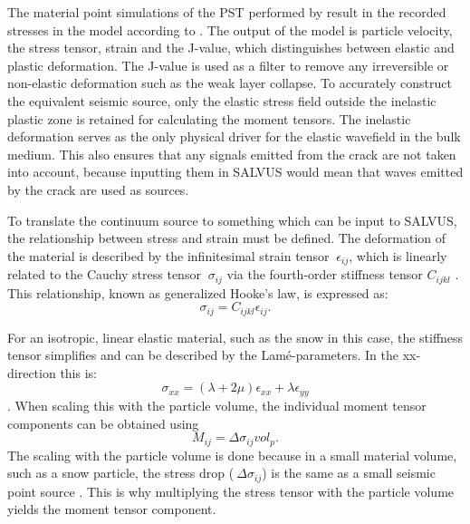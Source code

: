 The material point simulations of the PST performed by \parencite{gaumeDynamicAnticrackPropagation2018,trottetTransitionSubRayleighAnticrack2022} result in the recorded stresses in the model according to \cite{gaumeInvestigatingReleaseFlow2019}. The output of the model is particle velocity, the stress tensor, strain and the J-value, which distinguishes between elastic and plastic deformation. The J-value is used as a filter to remove any irreversible or non-elastic deformation such as the weak layer collapse. To accurately construct the equivalent seismic source, only the elastic stress field outside the inelastic plastic zone is retained for calculating the moment tensors. The inelastic deformation serves as the only physical driver for the elastic wavefield in the bulk medium. This also ensures that any signals emitted from the crack are not taken into account, because inputting them in SALVUS would mean that waves emitted by the crack are used as sources. \par

To translate the continuum source to something which can be input to SALVUS, the relationship between stress and strain must be defined. The deformation of the material is described by the infinitesimal strain tensor $\ \epsilon_{ij}$, which is linearly related to the Cauchy stress tensor $\ \sigma_{ij}$ via the fourth-order stiffness tensor $C_ {ijkl}$ \parencite{holzapfelNonlinearSolidMechanics2010}. This relationship, known as generalized Hooke's law, is expressed as:
\begin{equation}
  \sigma_{ij} = C_{ijkl} \epsilon_{ij}. 
\end{equation}

For an isotropic, linear elastic material, such as the snow in this case, the stiffness tensor simplifies and can be described by the Lamé-parameters. In the xx-direction this is: \begin{equation}
  \sigma_{xx} = (\lambda + 2\mu)\epsilon_{xx} + \lambda \epsilon_{yy}
\end{equation} \parencite{kAkiRichards19801981}. When scaling this with the particle volume, the individual moment tensor components can be obtained using \begin{equation}
  M_{ij} = \Delta\sigma_{ij} vol_p.
\end{equation} The scaling with the particle volume is done because in a small material volume, such as a snow particle, the stress drop ($\ \Delta \sigma_{ij}$) is the same as a small seismic point source \parencite{backusMomentTensorsOther1976}. This is why multiplying the stress tensor with the particle volume yields the moment tensor component.  \par


